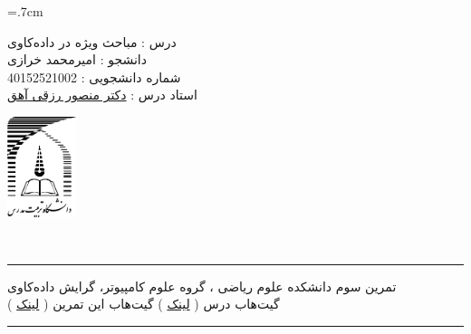 \documentclass[a4paper, 12pt]{article}
\begin{document}
	
	\noindent
	\begin{minipage}[c]{5cm}
		\baselineskip=.7cm
		\begin{flushright}
			درس : مباحث ویژه در داده‌کاوی
			\\
			دانشجو :
			امیرمحمد خرازی
			\\
			شماره دانشجویی :
			40152521002 
			\\
			استاد درس :  
			\href{mrezghi.ir}{دکتر منصور رزقی آهق}
		\end{flushright}
	\end{minipage}
	\hfill
	\begin{minipage}[c]{3cm}
		\begin{center}
			\href{modares.ac.ir}{
				\includegraphics[width=2cm]{logo.png}}
		\end{center}	
	\end{minipage}
	\\[1mm]
	\hrule depth .5mm \relax
	\begin{flushright}
		تمرین سوم
		\hfill
		دانشکده علوم ریاضی ، گروه علوم کامپیوتر، گرایش داده‌کاوی
		\\
		\vspace{5mm}
		گیت‌هاب درس (
		\href{https://github.com/A-M-Kharazi/Special-Topics-in-DataMining-TMU.git}{لینک}
		)
		\hfill
		گیت‌هاب این تمرین (
		\href{}{لینک}
		)
	\end{flushright}
	
	\hrule depth .5mm\relax
	
	
\end{document}
